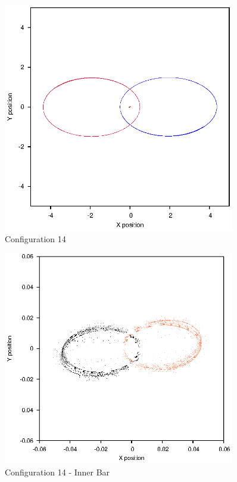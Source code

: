 \documentclass[a4paper,12pt]{article}
\begin{document}
\begin{figure}[H]
\centering
\includegraphics[width=0.9\textwidth]{./results/05-9-05-1/Orbit.eps}
\caption{Configuration 14}
\label{fig:config14}
\end{figure}
\begin{figure}[H]
\centering
\includegraphics[width=0.9\textwidth]{./results/05-9-05-1/Inner.eps}
\caption{Configuration 14 - Inner Bar}
\label{fig:config14i}
\end{figure}
\end{document}
